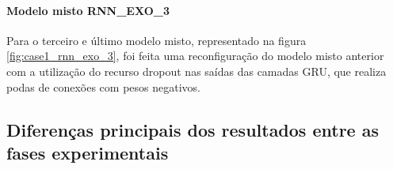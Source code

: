         \paragraph{Modelo misto RNN\_EXO\_3}
        Para o terceiro e último modelo misto, representado na figura \ref{fig:case1_rnn_exo_3}, foi feita uma reconfiguração do modelo misto anterior com a utilização do recurso dropout nas saídas das camadas GRU, que realiza podas de conexões com pesos negativos.
        \begin{figure}[H]
        \end{figure}
    \subsection{Diferenças principais dos resultados entre as fases experimentais}
